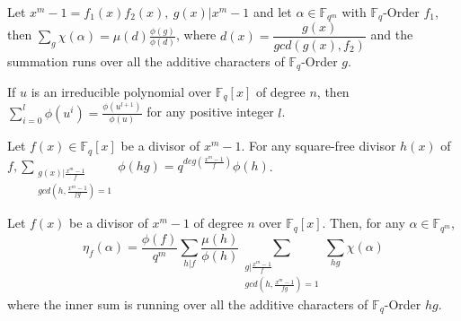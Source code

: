 \documentclass[10pt,a4paper]{amsart}
\begin{document}
    \begin{thm}\label{Sumaddi}
        Let $x^m-1 = f_1(x)f_2(x), ~g(x) \vert x^m-1$ and let $\alpha \in \mathbb{F}_{q^m}$ with $\mathbb{F}_q$-Order $f_1$, then
        $\displaystyle\sum_{g} \chi (\alpha) = \mu \left (d \right)\frac{\phi(g)}{\phi\left(d\right)}$, where $d(x) = \dfrac{g(x)}{gcd \left(g(x),f_2\right)}$ and the summation runs over all the additive characters of $\mathbb{F}_q$-Order $g$. 
    \end{thm}

    \begin{lem}\label{Lemmasumphi}
         If $u$ is an irreducible polynomial over $\mathbb{F}_q[x]$ of degree $n$, then $\displaystyle \sum_{i=0}^l\phi(u^i) = \frac{\phi(u^{l+1})}{\phi(u)}$ for any positive integer $l$.
     \end{lem}

    \begin{lem}\label{Lemmaphi(hg)}
        Let $f(x) \in \mathbb{F}_q[x]$ be a divisor of $x^m-1$. For any square-free divisor $h(x)$ of $f, \displaystyle \sum_{\substack{g(x) \vert \frac{x^m-1}{f}\\ gcd(h,\frac{x^m-1}{fg}) =1} } \phi(hg) = q^{deg(\frac{x^m-1}{f})}\phi(h)$.
    \end{lem}

     \begin{thm}\label{MainThm}
         Let $f(x)$ be a divisor of $x^m-1$ of degree $n$ over $\mathbb{F}_q[x]$. Then, for any $\alpha \in \mathbb{F}_{q^m}$,
         $$\eta_f(\alpha) = \displaystyle \frac{\phi(f)}{q^m}\sum_{h\vert f} \frac{\mu(h)}{\phi(h)} \sum_{\substack{g \vert \frac{x^m-1}{f}\\ gcd(h,\frac{x^m-1}{fg}) =1} } \sum_{hg} \chi(\alpha) $$  where the inner sum is running over all the additive characters of $\mathbb{F}_q$-Order $hg$.
     \end{thm}
\end{document}
